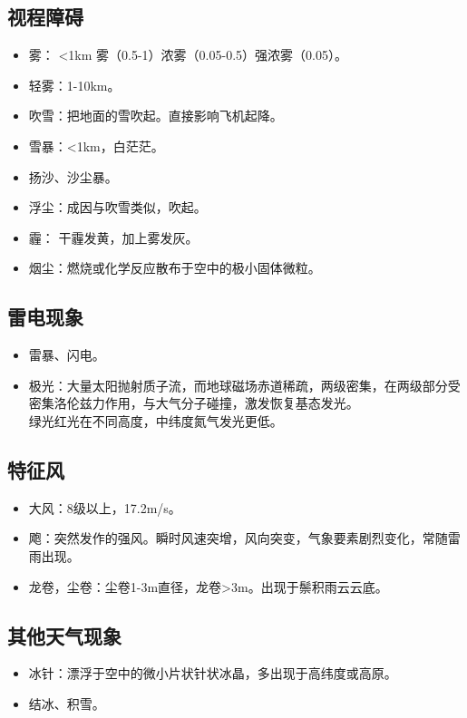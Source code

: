 \documentclass[UTF8,11pt]{ctexbook}
\begin{document}
\subsection{视程障碍}
\begin{itemize}
    \item 雾：  <1km 雾（0.5-1）浓雾（0.05-0.5）强浓雾（0.05）。
    \item 轻雾：1-10km。
    \item 吹雪：把地面的雪吹起。直接影响飞机起降。
    \item 雪暴：<1km，白茫茫。
    \item 扬沙、沙尘暴。
    \item 浮尘：成因与吹雪类似，吹起。
    \item 霾：  干霾发黄，加上雾发灰。
    \item 烟尘：燃烧或化学反应散布于空中的极小固体微粒。
\end{itemize}

\subsection{雷电现象}
\begin{itemize}
    \item 雷暴、闪电。
    \item 极光：大量太阳抛射质子流，而地球磁场赤道稀疏，两级密集，在两级部分受密集洛伦兹力作用，与大气分子碰撞，激发恢复基态发光。\\绿光红光在不同高度，中纬度氮气发光更低。
\end{itemize}

\subsection{特征风}
\begin{itemize}
    \item 大风：8级以上，17.2m/s。
    \item 飑：突然发作的强风。瞬时风速突增，风向突变，气象要素剧烈变化，常随雷雨出现。
    \item 龙卷，尘卷：尘卷1-3m直径，龙卷>3m。出现于鬃积雨云云底。
\end{itemize}

\subsection{其他天气现象}
\begin{itemize}
    \item 冰针：漂浮于空中的微小片状针状冰晶，多出现于高纬度或高原。
    \item 结冰、积雪。
\end{itemize}
\end{document}
